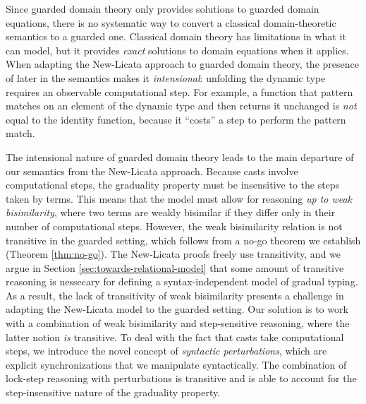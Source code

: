 
Since guarded domain theory only provides solutions to guarded domain equations,
there is no systematic way to convert a classical domain-theoretic semantics to
a guarded one.  Classical domain theory has limitations in what it can model,
but it provides \emph{exact} solutions to domain equations when it applies. When
adapting the New-Licata approach to guarded domain theory, the presence of later
in the semantics makes it \emph{intensional}: unfolding the dynamic type
requires an observable computational step. For example, a function that pattern
matches on an element of the dynamic type and then returns it unchanged is
\emph{not} equal to the identity function, because it ``costs'' a step to
perform the pattern match.


The intensional nature of guarded domain theory leads to the main departure of
our semantics from the New-Licata approach. Because casts involve computational
steps, the graduality property must be insensitive to the steps taken by terms.
This means that the model must allow for reasoning \emph{up to weak
bisimilarity}, where two terms are weakly bisimilar if they differ only in their
number of computational steps. However, the weak bisimilarity relation is not
transitive in the guarded setting, which follows from a no-go theorem we
establish (Theorem \ref{thm:no-go}). The New-Licata proofs freely use
transitivity, and we argue in Section \ref{sec:towards-relational-model} that
some amount of transitive reasoning is nessecary for defining a
syntax-independent model of gradual typing. As a result, the lack of
transitivity of weak bisimilarity presents a challenge in adapting the
New-Licata model to the guarded setting. Our solution is to work with a
combination of weak bisimilarity and step-sensitive reasoning, where the latter
notion \emph{is} transitive. To deal with the fact that casts take computational
steps, we introduce the novel concept of \emph{syntactic perturbations}, which
are explicit synchronizations that we manipulate syntactically. The combination
of lock-step reasoning with perturbations is transitive and is able to account
for the step-insensitive nature of the graduality property.

